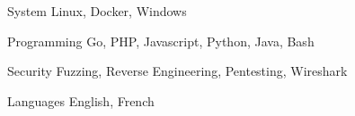 

\begin{cvskills}

  \cvskill
    {System} %
    {Linux, Docker, Windows} %

  \cvskill
    {Programming} %
    {Go, PHP, Javascript, Python, Java, Bash} %

  \cvskill
    {Security} %
    {Fuzzing, Reverse Engineering, Pentesting, Wireshark} %

  \cvskill
    {Languages} %
    {English, French} %

\end{cvskills}
